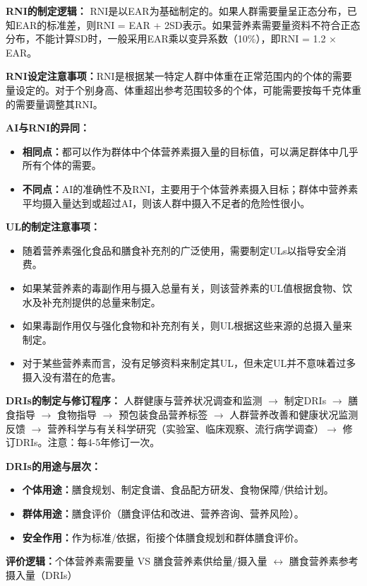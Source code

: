 \begin{keybox}
\textbf{RNI的制定逻辑：}
RNI是以EAR为基础制定的。如果人群需要量呈正态分布，已知EAR的标准差，则RNI = EAR + 2SD表示。如果营养素需要量资料不符合正态分布，不能计算SD时，一般采用EAR乘以变异系数（10\%），即RNI = 1.2 × EAR。

\textbf{RNI设定注意事项：}RNI是根据某一特定人群中体重在正常范围内的个体的需要量设定的。对于个别身高、体重超出参考范围较多的个体，可能需要按每千克体重的需要量调整其RNI。
\end{keybox}

\begin{keybox}
\textbf{AI与RNI的异同：}
\begin{itemize}[leftmargin=*]
    \item \textbf{相同点：}都可以作为群体中个体营养素摄入量的目标值，可以满足群体中几乎所有个体的需要。
    \item \textbf{不同点：}AI的准确性不及RNI，主要用于个体营养素摄入目标；群体中营养素平均摄入量达到或超过AI，则该人群中摄入不足者的危险性很小。
\end{itemize}
\end{keybox}

\begin{keybox}
\textbf{UL的制定注意事项：}
\begin{itemize}[leftmargin=*]
    \item 随着营养素强化食品和膳食补充剂的广泛使用，需要制定ULs以指导安全消费。
    \item 如果某营养素的毒副作用与摄入总量有关，则该营养素的UL值根据食物、饮水及补充剂提供的总量来制定。
    \item 如果毒副作用仅与强化食物和补充剂有关，则UL根据这些来源的总摄入量来制定。
    \item 对于某些营养素而言，没有足够资料来制定其UL，但未定UL并不意味着过多摄入没有潜在的危害。
\end{itemize}
\end{keybox}

\begin{tipbox}
\textbf{DRIs的制定与修订程序：}
人群健康与营养状况调查和监测 $\rightarrow$ 制定DRIs $\rightarrow$ 膳食指导 $\rightarrow$ 食物指导 $\rightarrow$ 预包装食品营养标签 $\rightarrow$ 人群营养改善和健康状况监测反馈 $\rightarrow$ 营养科学与有关科学研究（实验室、临床观察、流行病学调查）$\rightarrow$ 修订DRIs。注意：每4-5年修订一次。

\textbf{DRIs的用途与层次：}
\begin{itemize}[leftmargin=*]
    \item \textbf{个体用途：}膳食规划、制定食谱、食品配方研发、食物保障/供给计划。
    \item \textbf{群体用途：}膳食评价（膳食评估和改进、营养咨询、营养风险）。
    \item \textbf{安全作用：}作为标准/依据，衔接个体膳食规划和群体膳食评价。
\end{itemize}

\textbf{评价逻辑：}个体营养素需要量 VS 膳食营养素供给量/摄入量 $\leftrightarrow$ 膳食营养素参考摄入量（DRIs）
\end{tipbox}

